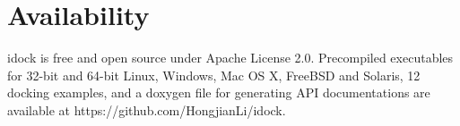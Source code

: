 \section{Availability}

idock is free and open source under Apache License 2.0. Precompiled executables for 32-bit and 64-bit Linux, Windows, Mac OS X, FreeBSD and Solaris, 12 docking examples, and a doxygen file for generating API documentations are available at https://github.com/HongjianLi/idock.


\chapterend

